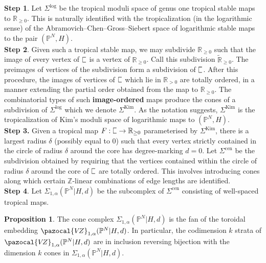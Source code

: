\documentclass[11pt]{amsart}
\newcommand{\plC}{\scalebox{0.8}[1.3]{$\sqsubset$}}
\newcommand{\Kim}{\operatorname{Kim}}
\newcommand{\PP}{\mathbb P}
\newcommand{\Z}{\mathbb{Z}}
\newcommand{\VZ}{\pazocal{V\!Z}}
\renewcommand{\to}{\rightarrow}
\newcommand{\RR}{\mathbb{R}}
\theoremstyle{definition}
\newtheorem{prop}[thm]{Proposition}
\theoremstyle{definition}
\begin{document}
\noindent
\textbf{Step 1}. Let $\Sigma^{\mathrm{log}}$ be the tropical moduli space of genus one tropical stable maps to $\mathbb R_{\geq 0}$. This is naturally identified with the tropicalization (in the logarithmic sense) of the Abramovich--Chen--Gross--Siebert space of logarithmic stable maps to the pair $(\mathbb P^N,H)$. \\

\noindent
\textbf{Step 2}. Given such a tropical stable map, we may subdivide $\mathbb R_{\geq 0}$ such that the image of every vertex of $\plC$ is a vertex of $\mathbb R_{\geq 0}$. Call this subdivision $\widetilde{\mathbb R}_{\geq 0}$. The preimages of vertices of the subdivision form a subdivision of $\plC$. After this procedure, the images of vertices of $\plC$ which lie in $\RR_{>0}$ are totally ordered, in a manner extending the partial order obtained from the map to $\mathbb R_{\geq 0}$. The combinatorial types of such \textbf{image-ordered} maps produce the cones of a subdivision of $\Sigma^{\mathrm{log}}$ which we denote $\Sigma^{\mathrm{Kim}}$. As the notation suggests, $\Sigma^{\Kim}$ is the tropicalization of Kim's moduli space of logarithmic maps to $(\PP^N,H)$.\\

\noindent
\textbf{Step 3.} Given a tropical map $F: \plC\to \mathbb R_{\geq 0}$ parameterised by $\Sigma^{\mathrm{Kim}}$, there is a largest radius $\delta$ (possibly equal to $0$) such that every vertex strictly contained in the circle of radius $\delta$ around the core has degree-marking $d=0$. Let $
\Sigma^{\mathrm{cen}}$ be the subdivision obtained by requiring that the vertices contained within the circle of radius $\delta$ around the core of $\plC$ are totally ordered. This involves introducing cones along which certain $\Z$-linear combinations of edge lengths are identified.\\

\noindent
\textbf{Step 4}. Let $\Sigma_{1,\alpha}(\mathbb P^N|H,d)$ be the subcomplex of $\Sigma^{\mathrm{cen}}$ consisting of well-spaced tropical maps.

\begin{prop}
The cone complex $
\Sigma_{1,\alpha}(\mathbb P^N|H,d)$ is the fan of the toroidal embedding $
\VZ_{1,\alpha}(\mathbb P^N|H,d)$. In particular, the codimension $k$ strata of $
\VZ_{1,\alpha}(\mathbb P^N|H,d)$ are in inclusion reversing bijection with the dimension $k$ cones in $
\Sigma_{1,\alpha}(\mathbb P^N|H,d)$.
\end{prop}
\end{document}
